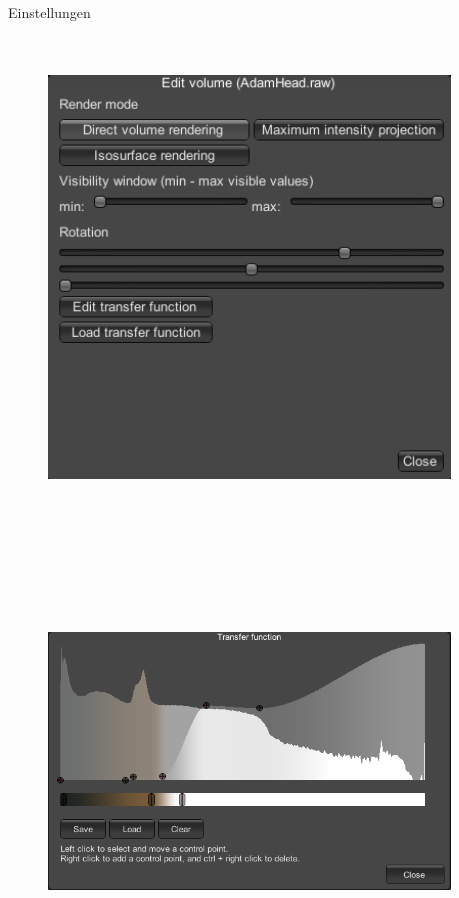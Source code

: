 \documentclass[final,hyperref={pdfpagelabels=false}]{beamer}
\begin{document}
\begin{frame}[t]
\begin{columns}[t]
\begin{column}{.025\textwidth}\end{column} %

\begin{column}{.465\textwidth} %


\begin{block}{Einstellungen}

    \newcommand{\imgheight}{127mm}
    \begin{figure}
    	\center
        \includegraphics[height=\imgheight]{editMenu}
        \includegraphics[height=\imgheight]{transferfunction}
    \end{figure}


\end{block}


\end{column}
\end{columns}
\end{frame}
\end{document}
